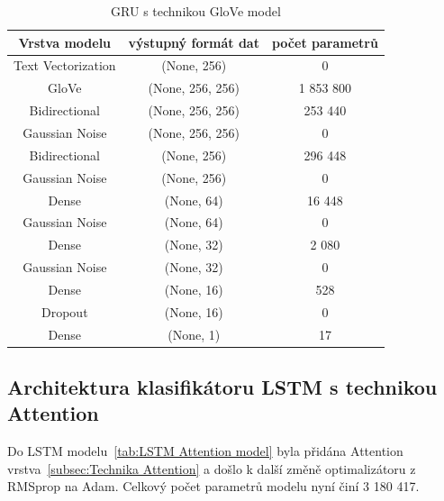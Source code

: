 \begin{table}[H]
	\centering
	\caption{GRU s technikou GloVe model}\label{tab:GRU GloVe model}
	\begin{tabular}{ c c c }
			\toprule
			Vrstva modelu & výstupný formát dat & počet parametrů\\
			\midrule
            Text Vectorization & (None, 256) & 0\\         
            GloVe & (None, 256, 256) & 1 853 800\\   
            Bidirectional & (None, 256, 256) & 253 440\\    
			Gaussian Noise & (None, 256, 256) & 0\\
            Bidirectional & (None, 256) & 296 448\\
			Gaussian Noise & (None, 256) & 0\\
            Dense & (None, 64) & 16 448\\ 
			Gaussian Noise & (None, 64) & 0\\
			Dense & (None, 32) & 2 080\\ 
			Gaussian Noise & (None, 32) & 0\\
			Dense & (None, 16) & 528\\ 
            Dropout & (None, 16) & 0\\   
            Dense & (None, 1) & 17\\ 
			\midrule
		\end{tabular}
\end{table}

\subsection{Architektura klasifikátoru LSTM s technikou Attention}\label{arch: LSTM Attention}
Do LSTM modelu~\ref{tab:LSTM Attention model} byla přidána Attention vrstva~\ref{subsec:Technika Attention} a došlo k další změně optimalizátoru z RMSprop na Adam.
Celkový počet parametrů modelu nyní činí 3 180 417.

